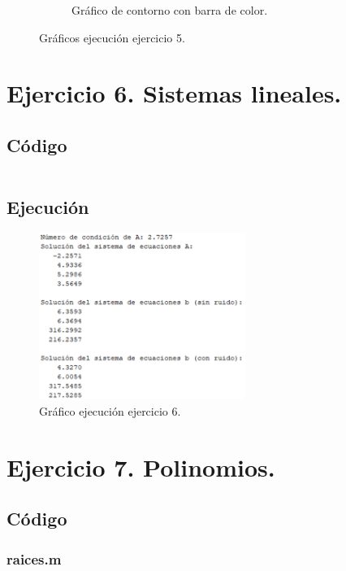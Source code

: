 \documentclass[a4paper, 12pt]{article}
\begin{document}
\begin{figure}[ht]
\begin{subfigure}{0.49\textwidth}
			\caption{Gráfico de contorno con barra de color.}
			\label{grafica5.3}
		\end{subfigure}
		\caption{Gráficos ejecución ejercicio 5.}
		\label{graficos5}
	\end{figure}
	
	\newpage
	
	\section{Ejercicio 6. Sistemas lineales.}
	
	\subsection{Código}
	\inputminted[fontsize=\scriptsize, linenos, breaklines=true, xleftmargin=0.75cm, frame=lines]{matlab}{code/Ejercicio6.m}
	\newpage
	\subsection{Ejecución}
	\begin{figure}[htp!]
		\centering
		\includegraphics[width=0.6\textwidth]{figures/ejc6.png}
		\caption{Gráfico ejecución ejercicio 6.}
	\end{figure}
	\newpage
	
	\section{Ejercicio 7. Polinomios.}
	
	\subsection{Código}
	\subsubsection*{raices.m}
	\inputminted[fontsize=\scriptsize, linenos, breaklines=true, xleftmargin=0.75cm, frame=lines]{matlab}{code/raices.m}
	\inputminted[fontsize=\scriptsize, linenos, breaklines=true, xleftmargin=0.75cm, frame=lines]{matlab}{code/Ejercicio7.m}
	\newpage
\end{document}
